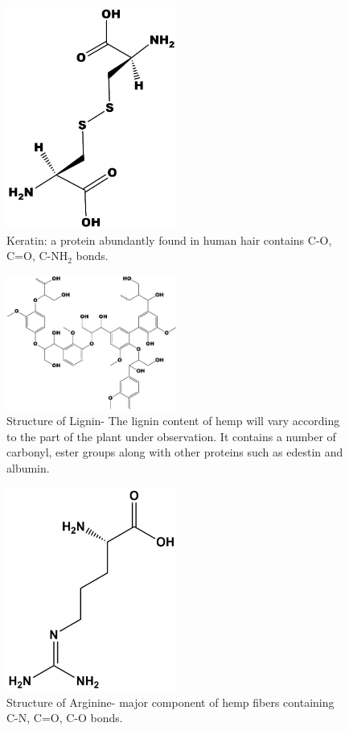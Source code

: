 \begin{figure}[tbh!]
  \centering
  \includegraphics[width=0.5\textwidth]{Figures/chap5fig/keratin}
    \caption{Keratin: a protein abundantly found in human hair contains C-O, C=O, C-NH$_2$ bonds.} 
    \label{Figures/chap5fig:keratin}
\end{figure}
\begin{figure}[tbh!]
  \centering
  \includegraphics[width=0.5\textwidth]{Figures/chap5fig/lignin}
    \caption{Structure of Lignin- The lignin content of hemp will vary according to the part of the plant under observation. It contains a number of carbonyl, ester groups along with other proteins such as edestin and albumin.}
  \label{Figures/chap5fig:lignin}
\end{figure}
\begin{figure}[tbh!]
  \centering
  \includegraphics[width=0.5\textwidth]{Figures/chap5fig/arginine}    
  \caption{Structure of Arginine- major component of hemp fibers containing C-N, C=O, C-O bonds.}
  \label{Figures/chap5fig:arginine}
\end{figure}
